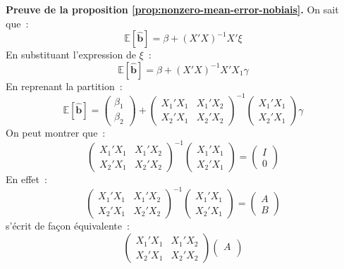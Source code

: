 \documentclass[10pt]{beamer}
\theoremstyle{plain}
\begin{document}
\begin{notes}

  \textbf{Preuve de la proposition \ref{prop:nonzero-mean-error-nobiais}.} On sait que~:
  \[
    \mathbb E\left[ \hat{\mathbf b} \right] = \beta + (X'X)^{-1}X'\xi
  \]
  En substituant l'expression de $\xi$~:
  \[
    \mathbb E\left[ \hat{\mathbf b} \right] = \beta + (X'X)^{-1}X'X_1\gamma
  \]
  En reprenant la partition~:
  \[
    \mathbb E\left[ \hat{\mathbf b} \right] =
    \begin{pmatrix}
      \beta_1\\ \beta_2
    \end{pmatrix}
    +
    \begin{pmatrix}
      X_1'X_1 & X_1'X_2\\
      X_2'X_1 & X_2'X_2
    \end{pmatrix}^{-1}
    \begin{pmatrix}
      X_1'X_1\\
      X_2'X_1
    \end{pmatrix}\gamma
  \]
  On peut montrer que~:
  \[
\begin{pmatrix}
      X_1'X_1 & X_1'X_2\\
      X_2'X_1 & X_2'X_2
    \end{pmatrix}^{-1}
    \begin{pmatrix}
      X_1'X_1\\
      X_2'X_1
    \end{pmatrix} =
    \begin{pmatrix}
      I\\
      0
    \end{pmatrix}
  \]
  En effet~:
  \[
    \begin{pmatrix}
      X_1'X_1 & X_1'X_2\\
      X_2'X_1 & X_2'X_2
    \end{pmatrix}^{-1}
    \begin{pmatrix}
      X_1'X_1\\
      X_2'X_1
    \end{pmatrix} =
    \begin{pmatrix}
      A\\
      B
    \end{pmatrix}
  \]
  s'écrit de façon équivalente~:
  \[
\begin{pmatrix}
      X_1'X_1 & X_1'X_2\\
      X_2'X_1 & X_2'X_2
\end{pmatrix}
\begin{pmatrix}
      A\\

\end{pmatrix}\]
\end{notes}
\end{document}
